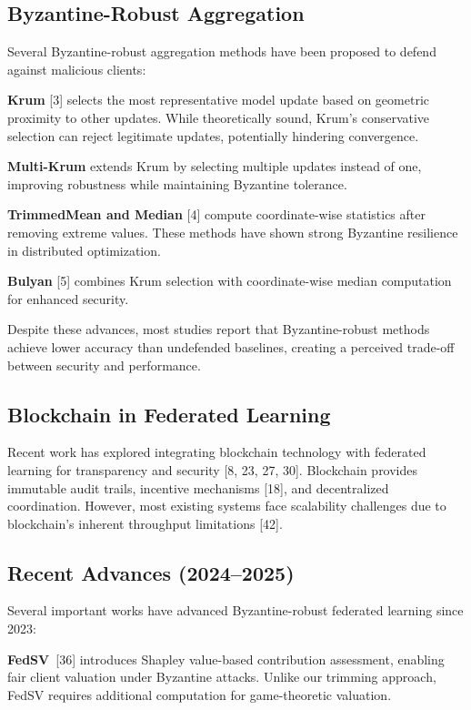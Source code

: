 \documentclass[12pt,a4paper,onecolumn]{article}
\begin{document}
\subsection{Byzantine-Robust Aggregation}

Several Byzantine-robust aggregation methods have been proposed to defend against malicious clients:

\textbf{Krum} [3] selects the most representative model update based on geometric proximity to other updates. While theoretically sound, Krum's conservative selection can reject legitimate updates, potentially hindering convergence.

\textbf{Multi-Krum} extends Krum by selecting multiple updates instead of one, improving robustness while maintaining Byzantine tolerance.

\textbf{TrimmedMean and Median} [4] compute coordinate-wise statistics after removing extreme values. These methods have shown strong Byzantine resilience in distributed optimization.

\textbf{Bulyan} [5] combines Krum selection with coordinate-wise median computation for enhanced security.

Despite these advances, most studies report that Byzantine-robust methods achieve lower accuracy than undefended baselines, creating a perceived trade-off between security and performance.

\subsection{Blockchain in Federated Learning}

Recent work has explored integrating blockchain technology with federated learning for transparency and security [8, 23, 27, 30]. Blockchain provides immutable audit trails, incentive mechanisms [18], and decentralized coordination. However, most existing systems face scalability challenges due to blockchain's inherent throughput limitations [42].

\subsection{Recent Advances (2024--2025)}

Several important works have advanced Byzantine-robust federated learning since 2023:

\textbf{FedSV}~[36] introduces Shapley value-based contribution assessment, enabling fair client valuation under Byzantine attacks. Unlike our trimming approach, FedSV requires additional computation for game-theoretic valuation.
\end{document}
